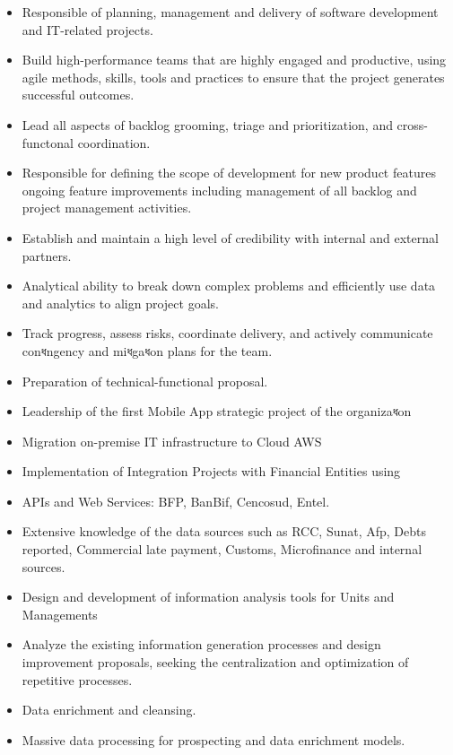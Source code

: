 \begin{itemize}
    \item Responsible of planning, management and delivery of software development and IT-related projects.
    \item Build high-performance teams that are highly engaged and productive, using agile methods, skills, tools and practices to ensure that the project generates successful outcomes.
    \item Lead all aspects of backlog grooming, triage and prioritization, and cross-functonal coordination.
    \item Responsible for defining the scope of development for new product features ongoing feature improvements including management of all backlog and project management activities.
    \item Establish and maintain a high level of credibility with internal and external partners.
    \item Analytical ability to break down complex problems and efficiently use data and analytics to align project goals.
    \item Track progress, assess risks, coordinate delivery, and actively communicate conধngency and miধgaধon plans for the team.
    \item Preparation of technical-functional proposal.
    \item Leadership of the first Mobile App strategic project of the organizaধon
    \item Migration on-premise IT infrastructure to Cloud AWS
    \item Implementation of Integration Projects with Financial Entities using
    \item APIs and Web Services: BFP, BanBif, Cencosud, Entel.
    \item Extensive knowledge of the data sources such as RCC, Sunat, Afp, Debts reported, Commercial late payment, Customs, Microfinance and internal sources.
    \item Design and development of information analysis tools for Units and Managements
    \item Analyze the existing information generation processes and design improvement proposals, seeking the centralization and optimization of repetitive processes.
    \item Data enrichment and cleansing.
    \item Massive data processing for prospecting and data enrichment models.
\end{itemize}

